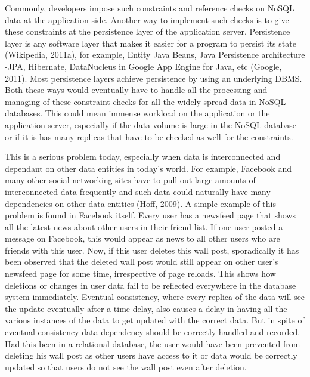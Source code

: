 Commonly, developers impose such constraints and reference checks on \ac{NoSQL} data
at the application side. Another way to implement such checks is to give these
constraints at the persistence layer of the application server. Persistence
layer is any software layer that makes it easier for a program to persist its
state (Wikipedia, 2011a), for example, Entity Java Beans, Java Persistence
architecture -JPA, Hibernate, DataNucleus in Google App Engine for Java, etc
(Google, 2011). Most persistence layers achieve persistence by using an
underlying \ac{DBMS}. Both these ways would eventually have to
handle all the processing and managing of these constraint checks for all the
widely spread data in \ac{NoSQL} databases. This could mean immense workload on the
application or the application server, especially if the data volume is large in
the \ac{NoSQL} database or if it is has many replicas that have to be checked as well
for the constraints.

This is a serious problem today, especially when data is interconnected and
dependant on other data entities in today's world. For example, Facebook and
many other social networking sites have to pull out large amounts of
interconnected data frequently and such data could naturally have many
dependencies on other data entities (Hoff, 2009). A simple example of this
problem is found in Facebook itself. Every user has a newsfeed page that shows
all the latest news about other users in their friend list. If one user posted a
message on Facebook, this would appear as news to all other users who are
friends with this user. Now, if this user deletes this wall post, sporadically
it has been observed that the deleted wall post would still appear on other
user's newsfeed page for some time, irrespective of page reloads. This shows how
deletions or changes in user data fail to be reflected everywhere in the
database system immediately. Eventual consistency, where every replica of the
data will see the update eventually after a time delay, also causes a delay in
having all the various instances of the data to get updated with the correct
data. But in spite of eventual consistency data dependency should be correctly
handled and recorded. Had this been in a relational database, the user would
have been prevented from deleting his wall post as other users have access to it
or data would be correctly updated so that users do not see the wall post even
after deletion.


